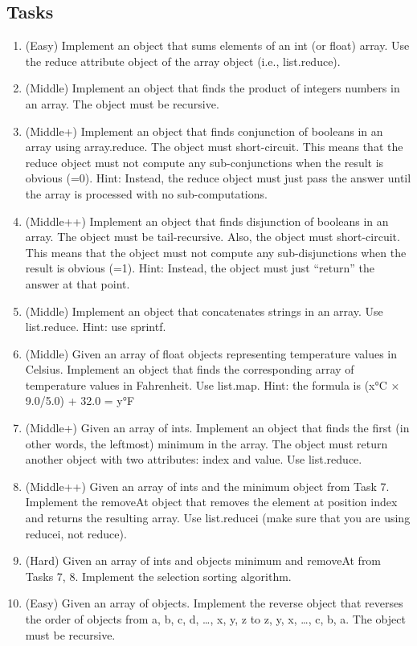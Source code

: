 \documentclass[12pt]{book}
\begin{document}
\subsection{Tasks}
\begin{enumerate}
    \item (Easy) Implement an object that sums elements of an int (or float) array. Use the reduce attribute object of the array object (i.e., list.reduce). 
    \item (Middle) Implement an object that finds the product of integers numbers in an array. The object must be recursive.
    \item (Middle+) Implement an object that finds conjunction of booleans in an array using array.reduce. The object must short-circuit. This means that the reduce object must not compute any sub-conjunctions when the result is obvious (=0). Hint: Instead, the reduce object must just pass the answer until the array is processed with no sub-computations.
    \item (Middle++) Implement an object that finds disjunction of booleans in an array. The object must be tail-recursive. Also, the object must short-circuit. This means that the object must not compute any sub-disjunctions when the result is obvious (=1). Hint: Instead, the object must just “return” the answer at that point.
    \item (Middle) Implement an object that concatenates strings in an array. Use list.reduce. Hint: use sprintf.
    \item (Middle) Given an array of float objects representing temperature values in Celsius. Implement an object that finds the corresponding array of temperature values in Fahrenheit. Use list.map. Hint: the formula is (x°C × 9.0/5.0) + 32.0 = y°F
    \item (Middle+) Given an array of ints. Implement an object that finds the first (in other words, the leftmost) minimum in the array. The object must return another object with two attributes: index and value. Use list.reduce.
    \item (Middle++) Given an array of ints and the minimum object from Task 7. Implement the removeAt object that removes the element at position index and returns the resulting array. Use list.reducei (make sure that you are using reducei, not reduce). 
    \item (Hard) Given an array of ints and objects minimum and removeAt from Tasks 7, 8. Implement the selection sorting algorithm. 
    \item  (Easy) Given an array of objects. Implement the reverse object that reverses the order of objects from a, b, c, d, …, x, y, z to z, y, x, …, c, b, a. The object must be recursive.

\end{enumerate}
\end{document}
